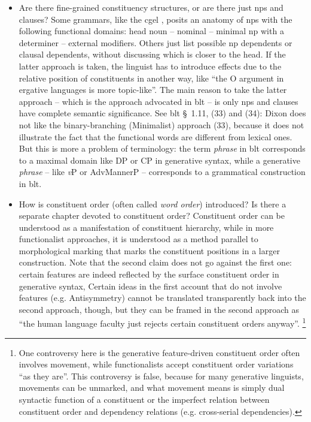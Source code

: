 \documentclass{article}
\newcommand*{\citesec}[1]{\S~{#1}}
\newcommand*{\term}[1]{\emph{#1}}
\begin{document}
\begin{itemize}
    \item Are there fine-grained constituency structures, or are there just \acl{np}s and clauses?
    Some grammars, like the \ac{cgel} \citep{cgel}, 
    posits an anatomy of \ac{np}s with the following functional domains:
    head noun -- nominal -- minimal \ac{np} with a determiner -- external modifiers.
    Others just list possible \ac{np} dependents or clausal dependents,
    without discussing which is closer to the head. 
    If the latter approach is taken,
    the linguist has to introduce effects due to the relative position of constituents in another way,
    like ``the O argument in ergative languages is more topic-like''.
    The main reason to take the latter approach -- which is the approach advocated in \ac{blt} --
    is only \ac{np}s and clauses have complete semantic significance.
    See \ac{blt} \citesec{1.11}, (33) and (34):
    Dixon does not like the binary-branching (Minimalist) approach (33),
    because it does not illustrate the fact that the functional words are different from lexical ones. 
    But this is more a problem of terminology:
    the term \term{phrase} in \ac{blt} corresponds to a maximal domain like DP or CP in generative syntax,
    while a generative \term{phrase} -- like \term{v}P or AdvMannerP -- 
    corresponds to a grammatical construction in \ac{blt}.
    
    \item How is constituent order (often called \term{word order}) introduced?
    Is there a separate chapter devoted to constituent order?
    Constituent order can be understood as a manifestation of constituent hierarchy,
    while in more functionalist approaches, 
    it is understood as a method parallel to morphological marking that 
    marks the constituent positions in a larger construction.
    Note that the second claim does not go against the first one:
    certain features are indeed reflected by the surface constituent order in generative syntax,
    Certain ideas in the first account that do not involve features (e.g. Antisymmetry)
    cannot be translated transparently back into the second approach, though,
    but they can be framed in the second approach as 
    ``the human language faculty just rejects certain constituent orders anyway''.%
    \footnote{
        One controversy here is the generative feature-driven constituent order often involves movement,
        while functionalists accept constituent order variations ``as they are''.
        This controversy is false, because for many generative linguists, 
        movements can be unmarked, and what movement means is simply 
        dual syntactic function of a constituent 
        or the imperfect relation between constituent order and dependency relations
        (e.g. cross-serial dependencies).
    }


\end{itemize}
\end{document}
